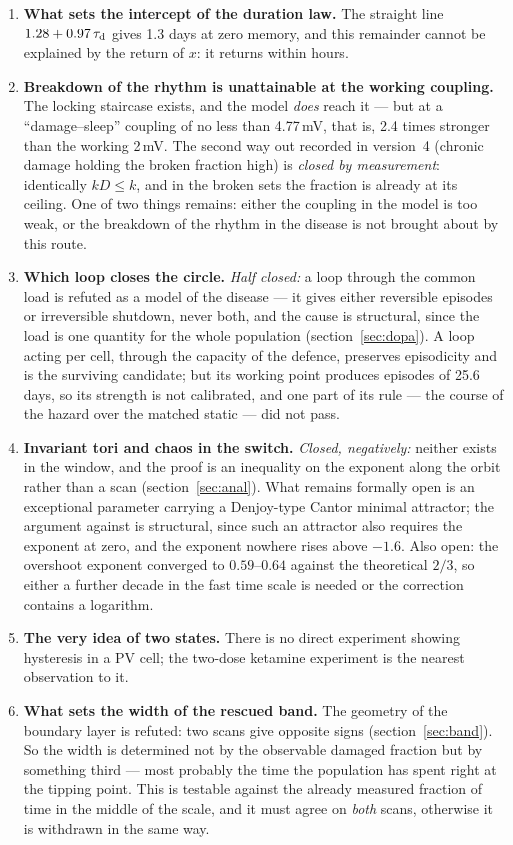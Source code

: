 \begin{enumerate}
\item \textbf{What sets the intercept of the duration law.} The straight line $1.28+0.97\,\tau_{\rm d}$ gives 1.3 days at zero memory, and this remainder cannot be explained by the return of $x$: it returns within hours.
\item \textbf{Breakdown of the rhythm is unattainable at the working coupling.} The locking staircase exists, and the model \emph{does} reach it --- but at a ``damage--sleep'' coupling of no less than 4.77\,mV, that is, 2.4 times stronger than the working 2\,mV. The second way out recorded in version~4 (chronic damage holding the broken fraction high) is \emph{closed by measurement}: identically $kD\le k$, and in the broken sets the fraction is already at its ceiling. One of two things remains: either the coupling in the model is too weak, or the breakdown of the rhythm in the disease is not brought about by this route.
\item \textbf{Which loop closes the circle.} \emph{Half closed:} a loop through the common load is refuted as a model of the disease --- it gives either reversible episodes or irreversible shutdown, never both, and the cause is structural, since the load is one quantity for the whole population (section~\ref{sec:dopa}). A loop acting per cell, through the capacity of the defence, preserves episodicity and is the surviving candidate; but its working point produces episodes of 25.6 days, so its strength is not calibrated, and one part of its rule --- the course of the hazard over the matched static --- did not pass.
\item \textbf{Invariant tori and chaos in the switch.} \emph{Closed, negatively:} neither exists in the window, and the proof is an inequality on the exponent along the orbit rather than a scan (section~\ref{sec:anal}). What remains formally open is an exceptional parameter carrying a Denjoy-type Cantor minimal attractor; the argument against is structural, since such an attractor also requires the exponent at zero, and the exponent nowhere rises above $-1.6$. Also open: the overshoot exponent converged to $0.59$--$0.64$ against the theoretical $2/3$, so either a further decade in the fast time scale is needed or the correction contains a logarithm.
\item \textbf{The very idea of two states.} There is no direct experiment showing hysteresis in a PV cell; the two-dose ketamine experiment is the nearest observation to it.
\item \textbf{What sets the width of the rescued band.} The geometry of the boundary layer is refuted: two scans give opposite signs (section~\ref{sec:band}). So the width is determined not by the observable damaged fraction but by something third --- most probably the time the population has spent right at the tipping point. This is testable against the already measured fraction of time in the middle of the scale, and it must agree on \emph{both} scans, otherwise it is withdrawn in the same way.

\end{enumerate}
